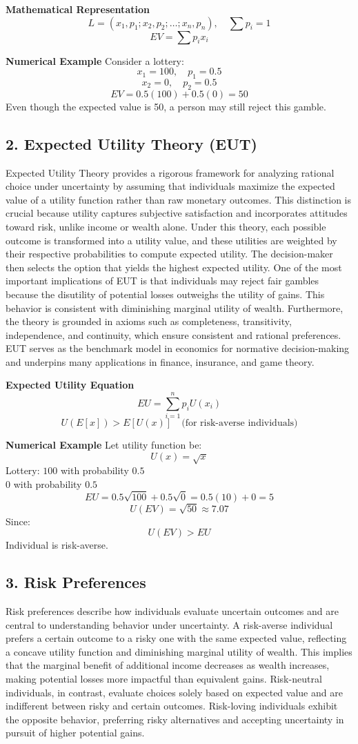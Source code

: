\documentclass[12pt,a4paper]{article}
\begin{document}
\textbf{Mathematical Representation}
\[ L = (x_1, p_1; x_2, p_2; \dots ; x_n, p_n), \quad \sum p_i = 1 \]
\[ EV = \sum p_i x_i \]

\textbf{Numerical Example}
Consider a lottery:
\[ x_1 = 100, \quad p_1 = 0.5 \]
\[ x_2 = 0, \quad p_2 = 0.5 \]
\[ EV = 0.5(100) + 0.5(0) = 50 \]
Even though the expected value is 50, a person may still reject this gamble.

\subsection*{2. Expected Utility Theory (EUT)}
Expected Utility Theory provides a rigorous framework for analyzing rational choice under uncertainty by assuming that individuals maximize the expected value of a utility function rather than raw monetary outcomes. This distinction is crucial because utility captures subjective satisfaction and incorporates attitudes toward risk, unlike income or wealth alone. Under this theory, each possible outcome is transformed into a utility value, and these utilities are weighted by their respective probabilities to compute expected utility. The decision-maker then selects the option that yields the highest expected utility. One of the most important implications of EUT is that individuals may reject fair gambles because the disutility of potential losses outweighs the utility of gains. This behavior is consistent with diminishing marginal utility of wealth. Furthermore, the theory is grounded in axioms such as completeness, transitivity, independence, and continuity, which ensure consistent and rational preferences. EUT serves as the benchmark model in economics for normative decision-making and underpins many applications in finance, insurance, and game theory.

\textbf{Expected Utility Equation}
\[ EU = \sum_{i=1}^{n} p_i U(x_i) \]
\[ U(E[x]) > E[U(x)] \quad \text{(for risk-averse individuals)} \]

\textbf{Numerical Example}
Let utility function be:
\[ U(x) = \sqrt{x} \]
Lottery:
$100$ with probability $0.5$ \\
$0$ with probability $0.5$
\[ EU = 0.5\sqrt{100} + 0.5\sqrt{0} = 0.5(10) + 0 = 5 \]
\[ U(EV) = \sqrt{50} \approx 7.07 \]
Since:
\[ U(EV) > EU \]
Individual is risk-averse.

\subsection*{3. Risk Preferences}
Risk preferences describe how individuals evaluate uncertain outcomes and are central to understanding behavior under uncertainty. A risk-averse individual prefers a certain outcome to a risky one with the same expected value, reflecting a concave utility function and diminishing marginal utility of wealth. This implies that the marginal benefit of additional income decreases as wealth increases, making potential losses more impactful than equivalent gains. Risk-neutral individuals, in contrast, evaluate choices solely based on expected value and are indifferent between risky and certain outcomes. Risk-loving individuals exhibit the opposite behavior, preferring risky alternatives and accepting uncertainty in pursuit of higher potential gains.
\end{document}

